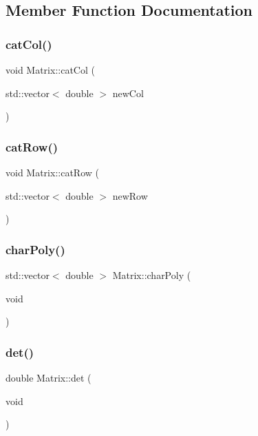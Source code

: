 \subsection{Member Function Documentation}
\mbox{\label{class_matrix_a1d288589b025eb2dad477b9699a79e9f}} 
\subsubsection{\texorpdfstring{cat\+Col()}{catCol()}}
{\footnotesize\ttfamily void Matrix\+::cat\+Col (\begin{DoxyParamCaption}\item[{std\+::vector$<$ double $>$}]{new\+Col }\end{DoxyParamCaption})}

\mbox{\label{class_matrix_a8e3776c15fa1abfd2ffcbd593098131f}} 
\subsubsection{\texorpdfstring{cat\+Row()}{catRow()}}
{\footnotesize\ttfamily void Matrix\+::cat\+Row (\begin{DoxyParamCaption}\item[{std\+::vector$<$ double $>$}]{new\+Row }\end{DoxyParamCaption})}

\mbox{\label{class_matrix_ac702d7055ec8bd0d804af3025b51cdec}} 
\subsubsection{\texorpdfstring{char\+Poly()}{charPoly()}}
{\footnotesize\ttfamily std\+::vector$<$ double $>$ Matrix\+::char\+Poly (\begin{DoxyParamCaption}\item[{void}]{ }\end{DoxyParamCaption})}

\mbox{\label{class_matrix_a8229fbecb4ec1119be6c210186ecb95c}} 
\subsubsection{\texorpdfstring{det()}{det()}}
{\footnotesize\ttfamily double Matrix\+::det (\begin{DoxyParamCaption}\item[{void}]{ }\end{DoxyParamCaption})}

